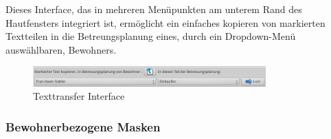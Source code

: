 \begin{itemize}
	\noindent
	Dieses Interface, das in mehreren Menüpunkten am unterem Rand des Hautfensters integriert ist, ermöglicht ein einfaches kopieren von
markierten Textteilen in die Betreungsplanung eines, durch ein Dropdown-Menü auswählbaren, Bewohners.
	\begin{figure}[h]
		\begin{center}
			\includegraphics[keepaspectratio=true, width=0.8\textwidth]{pics/client_texttransfer.png}
			\caption{Texttransfer Interface}
		\end{center}
	\end{figure}
	\FloatBarrier
\end{itemize}
\newpage
\subsubsection{Bewohnerbezogene Masken}
